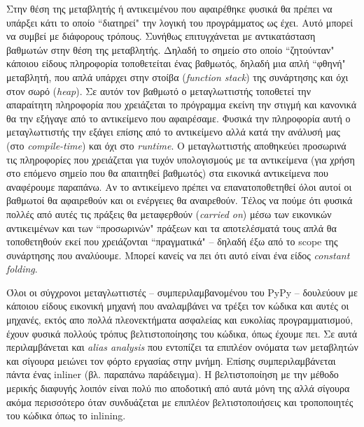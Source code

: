 Στην θέση της μεταβλητής ή αντικειμένου που αφαιρέθηκε φυσικά θα πρέπει να
υπάρξει κάτι το οποίο ``διατηρεί" την λογική του προγράμματος ως έχει. Αυτό
μπορεί να συμβεί με διάφορους τρόπους. Συνήθως επιτυγχάνεται με αντικατάσταση
βαθμωτών στην θέση της μεταβλητής. Δηλαδή το σημείο στο οποίο ``ζητούνταν"
κάποιου είδους πληροφορία τοποθετείται ένας βαθμωτός, δηλαδή μια απλή ``φθηνή"
μεταβλητή, που απλά υπάρχει στην στοίβα (\textit{function stack}) της συνάρτησης
και όχι στον σωρό (\textit{heap}). Σε αυτόν τον βαθμωτό ο μεταγλωττιστής
τοποθετεί την απαραίτητη πληροφορία που χρειάζεται το πρόγραμμα εκείνη την
στιγμή και κανονικά θα την εξήγαγε από το αντικείμενο που αφαιρέσαμε. Φυσικά την
πληροφορία αυτή ο μεταγλωττιστής την εξάγει επίσης από το αντικείμενο αλλά κατά
την ανάλυσή μας (στο \textit{compile-time}) και όχι στο \textit{runtime}. Ο
μεταγλωττιστής αποθηκεύει προσωρινά τις πληροφορίες που χρειάζεται για τυχόν
υπολογισμούς με τα αντικείμενα (για χρήση στο επόμενο σημείο που θα απαιτηθεί
βαθμωτός) στα εικονικά αντικείμενα που αναφέρουμε παραπάνω. Αν το αντικείμενο
πρέπει να επανατοποθετηθεί όλοι αυτοί οι βαθμωτοί θα αφαιρεθούν και οι ενέργειες
θα αναιρεθούν. Τέλος να πούμε ότι φυσικά πολλές από αυτές τις πράξεις θα
μεταφερθούν (\textit{carried on}) μέσω των εικονικών αντικειμένων και των
``προσωρινών" πράξεων και τα αποτελέσματά τους απλά θα τοποθετηθούν εκεί που
χρειάζονται ``πραγματικά" – δηλαδή έξω από το scope της συνάρτησης που αναλύουμε.
Μπορεί κανείς να πει ότι αυτό είναι ένα είδος \textit{constant folding}.

Όλοι οι σύγχρονοι μεταγλωττιστές – συμπεριλαμβανομένου του PyPy – δουλεύουν με
κάποιου είδους εικονική μηχανή που αναλαμβάνει να τρέξει τον κώδικα και αυτές οι
μηχανές, εκτός απο πολλά πλεονεκτήματα ασφαλείας και ευκολίας προγραμματισμού,
έχουν φυσικά πολλούς τρόπυς βελτιστοποίησης του κώδικα, όπως έχουμε πει. Σε αυτά
περιλαμβάνεται και \textit{alias analysis} που εντοπίζει τα επιπλέον ονόματα των
μεταβλητών και σίγουρα μειώνει τον φόρτο εργασίας στην μνήμη. Επίσης
συμπεριλαμβάνεται πάντα ένας inliner (βλ. παραπάνω παράδειγμα). Η βελτιστοποίηση
με την μέθοδο μερικής διαφυγής λοιπόν είναι πολύ πιο αποδοτική από αυτά μόνη της
αλλά σίγουρα ακόμα περισσότερο όταν συνδυάζεται με επιπλέον βελτιστοποιήσεις και
τροποποιητές του κώδικα όπως το inlining.

